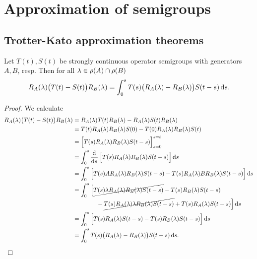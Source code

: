 \section{Approximation of semigroups}
\subsection{Trotter-Kato approximation theorems}
\begin{lemma}
Let $T(t), S(t)$ be strongly continuous operator semigroups with generators $A,B$, resp. Then for all $\lambda \in \rho(A)\cap \rho(B)$
\[ R_A(\lambda)\big( T(t) - S(t)\big)R_B(\lambda) = \int_0^s T(s)\big(R_A(\lambda) - R_B(\lambda)\big)S(t-s)\operatorname{d \!}{s}. \]
\end{lemma}
\begin{proof}
We calculate
\begin{align*}
R_A(\lambda)\big( T(t) - S(t)\big)R_B(\lambda) &= R_A(\lambda)T(t)R_B(\lambda) - R_A(\lambda)S(t)R_B(\lambda) \\
&= T(t)R_A(\lambda)R_B(\lambda)S(0) - T(0)R_A(\lambda)R_B(\lambda)S(t) \\
&= \Big[T(s)R_A(\lambda)R_B(\lambda)S(t-s)\Big]_{s=0}^{s=t} \\
&= \int_0^s \dod{}{s}\Big[T(s)R_A(\lambda)R_B(\lambda)S(t-s)\Big]\diff{s} \\
&= \int_0^s \Big[T(s)AR_A(\lambda)R_B(\lambda)S(t-s) - T(s)R_A(\lambda)BR_B(\lambda)S(t-s)\Big]\diff{s} \\
&= \int_0^s \begin{multlined}[t]\Big[
\cancel{T(s)\lambda R_A(\lambda)R_B(\lambda)S(t-s)} - T(s)R_B(\lambda)S(t-s) \\
- \cancel{T(s)R_A(\lambda)\lambda R_B(\lambda)S(t-s)} + T(s)R_A(\lambda)S(t-s)
\Big]\diff{s} \end{multlined}\\
&= \int_0^s \Big[T(s)R_A(\lambda)S(t-s) - T(s)R_B(\lambda)S(t-s)\Big]\diff{s} \\
&= \int_0^s T(s)\big(R_A(\lambda) - R_B(\lambda)\big)S(t-s)\diff{s}.
\end{align*}
\end{proof}

